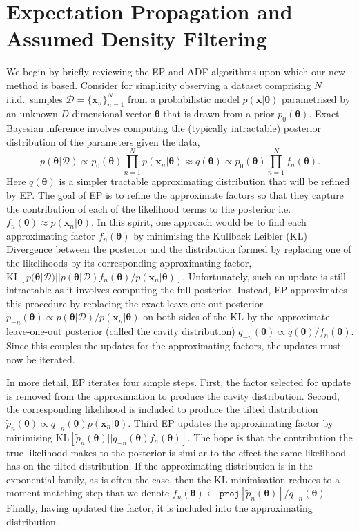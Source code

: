 

\section{Expectation Propagation and Assumed Density Filtering}
We begin by briefly reviewing the EP and ADF algorithms upon which our new method is based. Consider for simplicity observing a dataset comprising $N$ i.i.d.~samples $\mathcal{D} = \{\bm{x}_n \}_{n=1}^N$ from a probabilistic model $p(\bm{x}|\bm{\theta})$ parametrised by an unknown $D$-dimensional vector $\bm{\theta}$ that is drawn from a prior $p_0(\bm{\theta})$. Exact Bayesian inference involves computing the (typically intractable) posterior distribution of the parameters given the data, 
\begin{equation}
p(\bm{\theta} | \mathcal{D}) \propto p_0(\bm{\theta}) \prod_{n=1}^{N} p(\bm{x}_n | \bm{\theta}) \approx q(\bm{\theta}) \propto p_0(\bm{\theta}) \prod_{n=1}^{N} f_n(\bm{\theta}).
\end{equation}
%
Here $q(\bm{\theta})$  is a simpler tractable approximating distribution that will be refined by EP.
%
The goal of EP is to refine the approximate factors so that they capture the contribution of each of the likelihood terms to the posterior i.e.~$f_n(\bm{\theta}) \approx p(\bm{x}_n | \bm{\theta})$. In this spirit, one approach would be to find each approximating factor $f_n(\bm{\theta})$ by minimising the Kullback Leibler (KL) Divergence between the posterior and the distribution formed by replacing one of the likelihoods by its corresponding approximating factor,  $\mathrm{KL}[p(\bm{\theta}|\mathcal{D}) || p(\bm{\theta}|\mathcal{D}) f_n(\bm{\theta})/ p(\bm{x}_n | \bm{\theta})]$. Unfortunately, such an update is still intractable as it involves computing the full posterior. Instead, EP approximates this procedure by replacing the exact leave-one-out posterior $p_{-n}(\bm{\theta}) \propto p(\bm{\theta}|\mathcal{D}) / p(\bm{x}_n | \bm{\theta})$ on both sides of the KL by the approximate leave-one-out posterior (called the cavity distribution) $q_{-n}(\bm{\theta}) \propto q(\bm{\theta})/f_n(\bm{\theta})$. Since this couples the updates for the approximating factors, the updates must now be iterated.

In more detail, EP iterates four simple steps. First, the factor selected for update is removed from the approximation to produce the cavity distribution. Second, the corresponding likelihood is included to produce the tilted distribution $\tilde{p}_n(\bm{\theta}) \propto q_{-n}(\bm{\theta}) p(\bm{x}_n | \bm{\theta})$. Third EP updates the approximating factor by minimising $\mathrm{KL}[\tilde{p}_n(\bm{\theta}) || q_{-n}(\bm{\theta})  f_n(\bm{\theta})]$. The hope is that the contribution the true-likelihood makes to the posterior is similar to the effect the same likelihood has on the tilted distribution. If the approximating distribution is in the exponential family, as is often the case, then the KL minimisation reduces to a moment-matching step \cite{amari:ig} that we denote $f_n(\bm{\theta}) \leftarrow \mathtt{proj}[\tilde{p}_n(\bm{\theta})] / q_{-n}(\bm{\theta}) $. Finally, having updated the factor, it is included into the approximating distribution.
%

